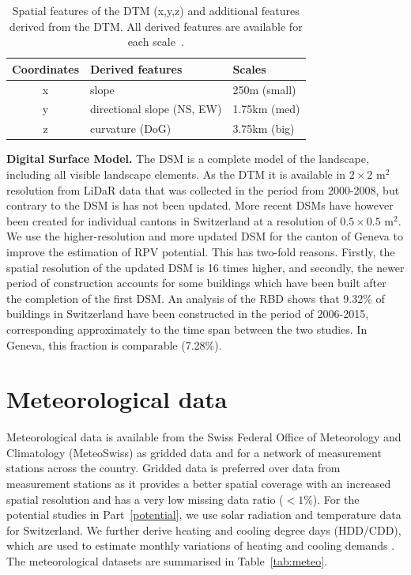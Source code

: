 \begin{table}[b]
\centering
\footnotesize
\caption{Spatial features of the DTM (x,y,z) and additional features derived from the DTM. All derived features are available for each scale~\cite{robert_spatial_2012}.}
\label{tab:DTM_ftrs}
\begin{tabular}{cll}
\hline
\textbf{Coordinates} & \textbf{Derived features} & \textbf{Scales} \\ \hline
x                    & slope                           & 250m (small)    \\
y                    & directional slope (NS, EW)      & 1.75km (med)    \\
z                    & curvature (DoG)                 & 3.75km (big)    \\ \hline
\end{tabular}
\end{table}

\textbf{Digital Surface Model.} The DSM is a complete model of the landscape, including all visible landscape elements. As the DTM it is available  in $2\times2$ m$^2$ resolution from LiDaR data that was collected in the period from 2000-2008, but contrary to the DSM is has not been updated. More recent DSMs have however been created for individual cantons in Switzerland at a resolution of $0.5\times0.5$ m$^2$. 
%
We use the higher-resolution and more updated DSM for the canton of Geneva to improve the estimation of RPV potential.
This has two-fold reasons. Firstly, the spatial resolution of the updated DSM is 16 times higher, and secondly, the newer period of construction accounts for some buildings which have been built after the completion of the first DSM.
An analysis of the RBD shows that 9.32\% of buildings in Switzerland have been constructed in the period of 2006-2015, corresponding approximately to the time span between the two studies. In Geneva, this fraction is comparable (7.28\%).


\section{Meteorological data}
\label{data_meteo}
Meteorological data is available from the Swiss Federal Office of Meteorology and Climatology (MeteoSwiss) as gridded data and for a network of measurement stations across the country. 
Gridded data is preferred over data from measurement stations as it provides a better spatial coverage with an increased spatial resolution and has a very low missing data ratio ($<1\%$). 
For the potential studies in Part~\ref{potential}, we use solar radiation and temperature data for Switzerland. We further derive heating and cooling degree days (HDD/CDD), which are used to estimate monthly variations of heating and cooling demands \cite{stadler_contribution_2018}. The meteorological datasets are summarised in Table~\ref{tab:meteo}.

